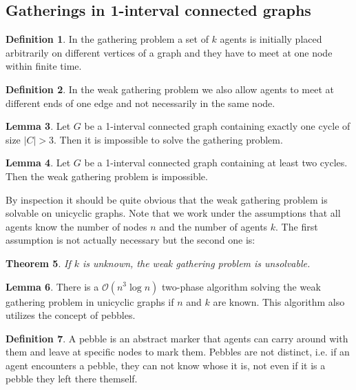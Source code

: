 \documentclass[a4paper, 12pt]{article}
\theoremstyle{plain}
\newtheorem{theorem}{Theorem}[section] %
\theoremstyle{definition}
\newtheorem{definition}[theorem]{Definition} %
\theoremstyle{lemma}
\newtheorem{lemma}[theorem]{Lemma}
\theoremstyle{remark}
\theoremstyle{corollary}
\theoremstyle{example}
\begin{document}
	\subsection{Gatherings in 1-interval connected graphs}
	\begin{definition}
		In the gathering problem a set of $k$ agents is initially placed arbitrarily on different vertices of a graph and they have to meet at one node within finite time.
	\end{definition}
	\begin{definition}
		In the weak gathering problem we also allow agents to meet at different ends of one edge and not necessarily in the same node.
	\end{definition}
	\begin{lemma}
		Let $G$ be a 1-interval connected graph containing exactly one cycle of size $\left|C\right|>3$. Then it is impossible to solve the gathering problem.
	\end{lemma}
	\begin{lemma}
		Let $G$ be a 1-interval connected graph containing at least two cycles. Then the weak gathering problem is impossible.
	\end{lemma}
	By inspection it should be quite obvious that the weak gathering problem is solvable on unicyclic graphs. Note that we work under the assumptions that all agents know the number of nodes $n$ and the number of agents $k$. The first assumption is not actually necessary but the second one is:
	\begin{theorem}
		If $k$ is unknown, the weak gathering problem is unsolvable.
	\end{theorem}
	\begin{lemma}
		There is a $\mathcal{O}(n^3 \log n)$ two-phase algorithm solving the weak gathering problem in unicyclic graphs if $n$ and $k$ are known. This algorithm also utilizes the concept of pebbles.
	\end{lemma}
	\begin{definition}
		A pebble is an abstract marker that agents can carry around with them and leave at specific nodes to mark them. Pebbles are not distinct, i.e. if an agent encounters a pebble, they can not know whose it is, not even if it is a pebble they left there themself.
	\end{definition}
\end{document}
